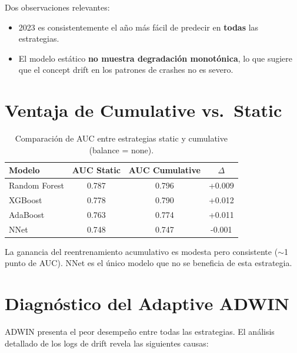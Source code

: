 \documentclass[11pt,a4paper]{article}
\begin{document}
Dos observaciones relevantes:
\begin{itemize}[nosep]
    \item 2023 es consistentemente el año más fácil de predecir en \textbf{todas} las estrategias.
    \item El modelo estático \textbf{no muestra degradación monotónica}, lo que sugiere que el concept drift en los patrones de crashes no es severo.
\end{itemize}

\section{Ventaja de Cumulative vs.\ Static}

\begin{table}[H]
\centering
\caption{Comparación de AUC entre estrategias static y cumulative (balance = none).}
\label{tab:cumul_vs_static}
\begin{tabular}{@{}lS[table-format=1.3]S[table-format=1.3]S[table-format=+1.3, table-space-text-post=***]@{}}
\toprule
\textbf{Modelo} & {\textbf{AUC Static}} & {\textbf{AUC Cumulative}} & {\textbf{$\Delta$}} \\
\midrule
Random Forest & 0.787 & 0.796 & +0.009 \\
XGBoost       & 0.778 & 0.790 & +0.012 \\
AdaBoost      & 0.763 & 0.774 & +0.011 \\
NNet          & 0.748 & 0.747 & -0.001 \\
\bottomrule
\end{tabular}
\end{table}

La ganancia del reentrenamiento acumulativo es modesta pero consistente ($\sim$1 punto de AUC). NNet es el único modelo que no se beneficia de esta estrategia.

\section{Diagnóstico del Adaptive ADWIN}

ADWIN presenta el peor desempeño entre todas las estrategias. El análisis detallado de los logs de drift revela las siguientes causas:
\end{document}
